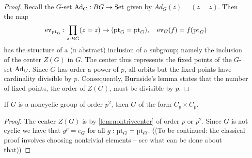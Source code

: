 \begin{proof}
  Recall the $G$-set $\mathrm{Ad}_G:BG\to\mathord{\mathrm{Set}}$ given by $Ad_G(z)=(z=z)$.  Then the map  $$\mathrm{ev}_{{\mathord{\mathrm{pt}}}_G}:\prod_{z:BG}(z=z)\to({\mathord{\mathrm{pt}}}_G={\mathord{\mathrm{pt}}}_G),\quad \mathrm{ev}_G(f)=f({\mathord{\mathrm{pt}}}_G)$$  
has the structure of a (n abstract) inclusion of a subgroup; namely the inclusion of the center $Z(G)$ in $G$.  
The center thus represents the fixed points of the $G$-set $\mathrm{Ad}_G$.  
Since $G$ has order a power of $p$, all orbits but the fixed points have cardinality divisible by $p$.  
Consequently, Burnside's lemma states that the number of fixed points, \ie the order of $Z(G)$, must be divisible by $p$.
\end{proof}
\begin{corollary}
  \label{cor:orderpsquaredgroups}
  If $G$ is a noncyclic group of order $p^2$, then $G$ of the form $C_p\times C_p$.
\end{corollary}
\begin{proof}
  The center $Z(G)$ is by \cref{lem:nontrivcenter} of order $p$ or $p^2$.
  Since $G$ is not cyclic we have that $g^p=e_G$ for all $g:{\mathord{\mathrm{pt}}}_G={\mathord{\mathrm{pt}}}_G$.    
((To be continued: the classical proof involves choosing nontrivial elements  -- see what can be done about that))
\end{proof}
